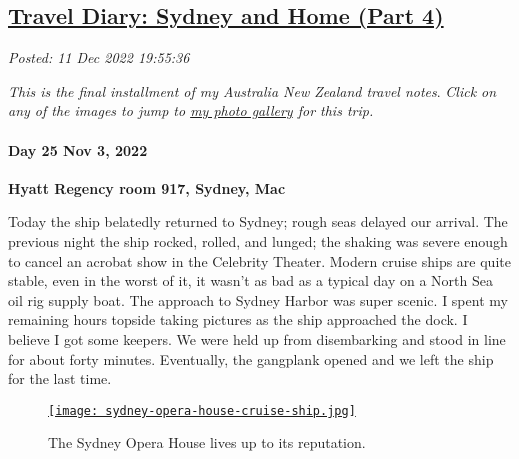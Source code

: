 %

\subsection*{\href{http://analyzethedatanotthedrivel.org/2022/12/11/travel-diary-sydney-and-home-part-4/}{Travel Diary: Sydney and Home (Part 4)}}


\noindent\emph{Posted: 11 Dec 2022 19:55:36}
\vspace{6pt}

\emph{This is the final installment of my Australia New Zealand travel
notes}. \emph{Click on any of the images to jump to
\href{https://conceptcontrol.smugmug.com/Trips/Overseas/Australia-New-Zealand-2022/}{my
photo gallery} for this trip.}

%

\hypertarget{day-25-nov-3-2022-hyatt-regency-room-917-sydney-mac}{%
\paragraph{\texorpdfstring{\textbf{Day 25 Nov 3, 2022}}{Day 25 Nov 3, 2022}}\label{day-25-nov-3-2022-hyatt-regency-room-917-sydney-mac}}

\textbf{Hyatt Regency room 917, Sydney, Mac}

Today the ship belatedly returned to Sydney; rough seas delayed our
arrival. The previous night the ship rocked, rolled, and lunged; the
shaking was severe enough to cancel an acrobat show in the Celebrity
Theater. Modern cruise ships are quite stable, even in the worst of it,
it wasn't as bad as a typical day on a North Sea oil rig supply boat.
The approach to Sydney Harbor was super scenic. I spent my remaining
hours topside taking pictures as the ship approached the dock. I believe
I got some keepers. We were held up from disembarking and stood in line
for about forty minutes. Eventually, the gangplank opened and we left
the ship for the last time.


\captionsetup[figure]{labelformat=empty}
\begin{figure}[htbp]
\centering
\href{https://conceptcontrol.smugmug.com/Trips/Overseas/Australia-New-Zealand-2022/i-8DNHGRR/A}{\texttt{[image: sydney-opera-house-cruise-ship.jpg]}}
\caption{The Sydney Opera House lives up to its reputation.}
\label{fig:7627x0}
\end{figure}
 

